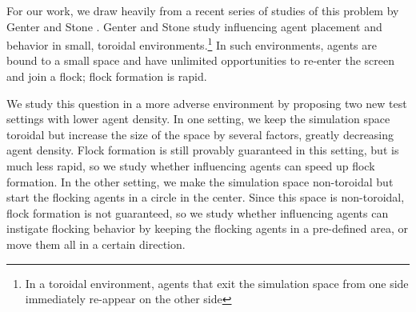 
For our work, we draw heavily from a recent series of studies of this problem by
Genter and Stone \cite{genter2013backsearch, genter2013visionstationary, 
genter2014neighborsorientherd, genter2015placement, genter2016facegoalfacecurrent, 
genter201612steplookahead, genterthesis}.
Genter and Stone study influencing agent placement and behavior in small,
toroidal environments.\footnote{In a toroidal environment, agents that exit the
simulation space from one side immediately re-appear on the other side}
In such environments, agents are bound to a small space and have unlimited 
opportunities to re-enter the screen and join a flock; flock formation is rapid.

We study this question in a more adverse environment by proposing two new test 
settings with lower agent density.
In one setting, we keep the simulation space toroidal but increase the size of
the space by several factors, greatly decreasing agent density.
Flock formation is still provably guaranteed in this setting, but is much less
rapid, so we study whether influencing agents can speed up flock formation.
In the other setting, we make the simulation space non-toroidal but start the
flocking agents in a circle in the center.
Since this space is non-toroidal, flock formation is not guaranteed, so we
study whether influencing agents can instigate flocking behavior by keeping the
flocking agents in a pre-defined area, or move them all in a certain direction.


